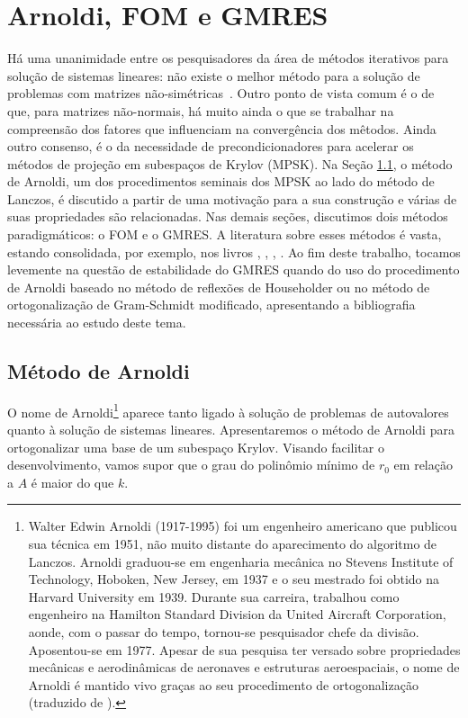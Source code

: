 
\chapter{Arnoldi, FOM e GMRES}
\label{chap:gmes}

Há uma unanimidade entre os pesquisadores da área de métodos iterativos para solução de sistemas lineares: não existe o melhor método para a solução de problemas com matrizes não-simétricas~\cite{NachtigalReddyEtAl1992How}. Outro ponto de vista comum é o de que, para matrizes não-normais, há muito ainda o  que se trabalhar na compreensão dos fatores que influenciam na convergência dos mêtodos. Ainda outro consenso, é o da necessidade de precondicionadores para acelerar os métodos de projeção em subespaços de Krylov (MPSK). Na Seção \ref{arnol_sec_arnol}, o método de Arnoldi,  um dos procedimentos seminais dos MPSK ao lado do método de Lanczos, é discutido a partir de uma motivação para a sua construção e várias de suas propriedades são relacionadas. Nas demais seções, discutimos dois métodos paradigmáticos: o FOM e o GMRES. A literatura sobre esses métodos é vasta, estando consolidada, por exemplo, nos livros \cite{Brezinski2002Outils}, \cite{Greenbaum97Iterative}, \cite{Meurant2020Krylov} \cite{Saad03Iterative},  \cite{Vorst03Iterative}.  Ao fim deste trabalho, tocamos levemente na questão de estabilidade do GMRES quando do uso  do procedimento de Arnoldi baseado no método de reflexões de Householder ou no método de ortogonalização de Gram-Schmidt modificado,  apresentando a bibliografia necessária ao estudo deste tema. 

\section{Método de Arnoldi}\label{arnol_sec_arnol}
O nome de Arnoldi\footnote{Walter Edwin Arnoldi (1917-1995) foi um engenheiro americano que publicou sua técnica em 1951, não muito distante do aparecimento do algoritmo de Lanczos. Arnoldi graduou-se em engenharia mecânica no Stevens Institute of Technology, Hoboken, New
Jersey, em 1937 e o seu mestrado foi obtido na Harvard University em 1939. Durante sua carreira, trabalhou como engenheiro na Hamilton Standard Division da United Aircraft Corporation, aonde, com o passar do tempo, tornou-se pesquisador chefe da divisão. Aposentou-se em 1977. Apesar de sua pesquisa ter versado sobre propriedades mecânicas e aerodinâmicas de aeronaves e estruturas aeroespaciais, o nome de Arnoldi é mantido vivo graças ao seu procedimento de ortogonalização (traduzido de \cite{Meyer00Matrix}).} aparece tanto ligado à solução de problemas de autovalores quanto à solução de sistemas lineares.  Apresentaremos o método de Arnoldi \cite{Arnoldi51principle} para ortogonalizar uma base de um subespaço Krylov.
 Visando facilitar o desenvolvimento, vamos supor que o grau do polinômio mínimo  de $r_0$ em relação a $A$ é maior do que $k$.

